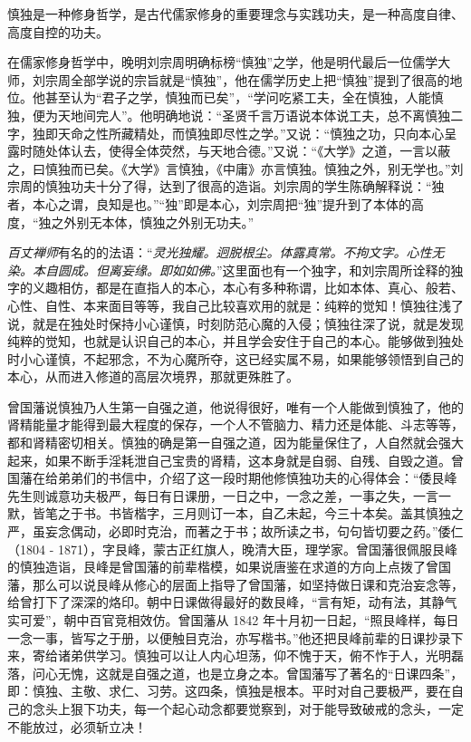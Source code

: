 慎独是一种修身哲学，是古代儒家修身的重要理念与实践功夫，是一种高度自律、高度自控的功夫。

在儒家修身哲学中，晚明刘宗周明确标榜“慎独”之学，他是明代最后一位儒学大师，刘宗周全部学说的宗旨就是“慎独”，他在儒学历史上把“慎独”提到了很高的地位。他甚至认为“君子之学，慎独而已矣”，“学问吃紧工夫，全在慎独，人能慎独，便为天地间完人”。他明确地说：“圣贤千言万语说本体说工夫，总不离慎独二字，独即天命之性所藏精处，而慎独即尽性之学。”又说：“慎独之功，只向本心呈露时随处体认去，使得全体荧然，与天地合德。”又说：“《大学》之道，一言以蔽之，曰慎独而已矣。《大学》言慎独，《中庸》亦言慎独。慎独之外，别无学也。”刘宗周的慎独功夫十分了得，达到了很高的造诣。刘宗周的学生陈确解释说：“独者，本心之谓，良知是也。”“独”即是本心，刘宗周把“独”提升到了本体的高度，“独之外别无本体，慎独之外别无功夫。”

\textit{百丈禅师}有名的的法语：“\textit{灵光独耀。迥脱根尘。体露真常。不拘文字。心性无染。本自圆成。但离妄缘。即如如佛。}”这里面也有一个独字，和刘宗周所诠释的独字的义趣相仿，都是在直指人的本心，本心有多种称谓，比如本体、真心、般若、心性、自性、本来面目等等，我自己比较喜欢用的就是：纯粹的觉知！慎独往浅了说，就是在独处时保持小心谨慎，时刻防范心魔的入侵；慎独往深了说，就是发现纯粹的觉知，也就是认识自己的本心，并且学会安住于自己的本心。能够做到独处时小心谨慎，不起邪念，不为心魔所夺，这已经实属不易，如果能够领悟到自己的本心，从而进入修道的高层次境界，那就更殊胜了。

曾国藩说慎独乃人生第一自强之道，他说得很好，唯有一个人能做到慎独了，他的肾精能量才能得到最大程度的保存，一个人不管脑力、精力还是体能、斗志等等，都和肾精密切相关。慎独的确是第一自强之道，因为能量保住了，人自然就会强大起来，如果不断手淫耗泄自己宝贵的肾精，这本身就是自弱、自残、自毁之道。曾国藩在给弟弟们的书信中，介绍了这一段时期他修慎独功夫的心得体会：“倭艮峰先生则诚意功夫极严，每日有日课册，一日之中，一念之差，一事之失，一言一默，皆笔之于书。书皆楷字，三月则订一本，自乙未起，今三十本矣。盖其慎独之严，虽妄念偶动，必即时克治，而著之于书；故所读之书，句句皆切要之药。”倭仁（1804 - 1871），字艮峰，蒙古正红旗人，晚清大臣，理学家。曾国藩很佩服艮峰的慎独造诣，艮峰是曾国藩的前辈楷模，如果说唐鉴在求道的方向上点拨了曾国藩，那么可以说艮峰从修心的层面上指导了曾国藩，如坚持做日课和克治妄念等，给曾打下了深深的烙印。朝中日课做得最好的数艮峰，“言有矩，动有法，其静气实可爱”，朝中百官竞相效仿。曾国藩从 1842 年十月初一日起，“照艮峰样，每日一念一事，皆写之于册，以便触目克治，亦写楷书。”他还把艮峰前辈的日课抄录下来，寄给诸弟供学习。慎独可以让人内心坦荡，仰不愧于天，俯不怍于人，光明磊落，问心无愧，这就是自强之道，也是立身之本。曾国藩写了著名的“日课四条”，即：慎独、主敬、求仁、习劳。这四条，慎独是根本。平时对自己要极严，要在自己的念头上狠下功夫，每一个起心动念都要觉察到，对于能导致破戒的念头，一定不能放过，必须斩立决！

